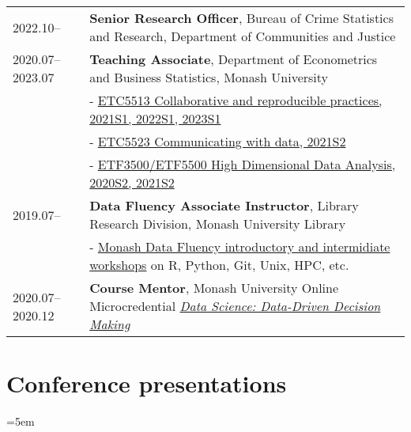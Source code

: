 \documentclass[10pt,a4paper,]{article}
\begin{document}
\begin{tabular}{ll}
  2022.10-- & \textbf{Senior Research Officer}, Bureau of Crime Statistics and Research, Department of Communities and Justice \\ 
  2020.07--2023.07 & \textbf{Teaching Associate}, Department of Econometrics and Business Statistics, Monash University \\ 
   & - \href{https://handbook.monash.edu/2021/units/ETC5513?year=2021}{ETC5513 Collaborative and reproducible practices, 2021S1, 2022S1, 2023S1} \\ 
   & - \href{https://handbook.monash.edu/2021/units/ETC5523?year=2021}{ETC5523 Communicating with data, 2021S2} \\ 
   & - \href{https://handbook.monash.edu/2020/units/ETF5500?year=2020}{ETF3500/ETF5500 High Dimensional Data Analysis, 2020S2, 2021S2} \\ 
  2019.07-- & \textbf{Data Fluency Associate Instructor}, Library Research Division, Monash University Library \\ 
   & - \href{https://www.monash.edu/data-fluency/home}{Monash Data Fluency introductory and intermidiate workshops} on R, Python, Git, Unix, HPC, etc. \\ 
  2020.07--2020.12 & \textbf{Course Mentor}, Monash University Online Microcredential \href{https://www.futurelearn.com/microcredentials/data-driven-decision-making?utm_source=faculty_website&utm_medium=monash_organic_referrer&utm_campaign=mc_jan}{\textit{Data Science: Data-Driven Decision Making}} \\ 
  \end{tabular}

\section{Conference presentations}\label{conference-presentations}

\hangindent=5em
\end{document}
